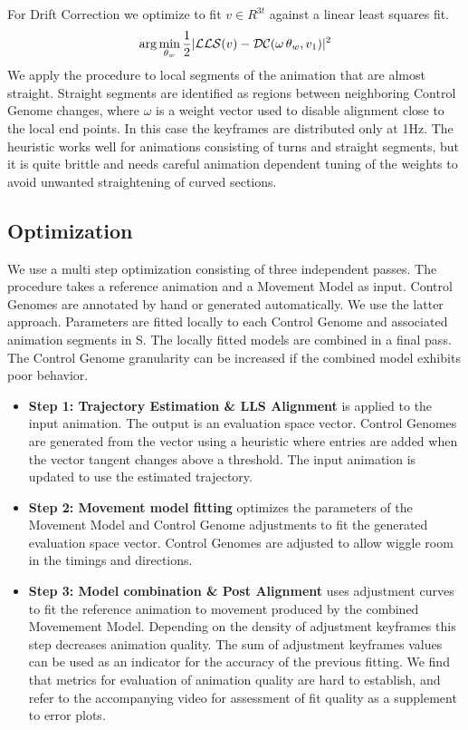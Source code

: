 For Drift Correction we optimize to fit $v \in R^{3t}$ against a linear least squares fit. 
\begin{subequations}
\begin{align}
    \arg\min_{\theta_{w}}{
        \frac{1}{2}|\mathcal{LLS}(v)-\mathcal{DC}(\omega\,\theta_{w},v_1)|^2
    }
\end{align}
\end{subequations}
We apply the procedure to local segments of the animation that are almost straight. Straight segments are identified as regions between neighboring Control Genome changes, where $\omega$ is a weight vector used to disable alignment close to the local end points. In this case the keyframes are distributed only at 1Hz. The heuristic works well for animations consisting of turns and straight segments, but it is quite brittle and needs careful animation dependent tuning of the weights to avoid unwanted straightening of curved sections.
\subsection{Optimization}
We use a multi step optimization consisting of three independent passes. The procedure takes a reference animation and a Movement Model as input. Control Genomes are annotated by hand or generated automatically. We use the latter approach. Parameters are fitted locally to each Control Genome and associated animation segments in S. The locally fitted models are combined in a final pass. The Control Genome granularity can be increased if the combined model exhibits poor behavior.
\begin{itemize}
    \item {\bf{Step 1: Trajectory Estimation \& LLS Alignment}} is applied to the input animation. The output is an evaluation space vector. Control Genomes are generated from the vector using a heuristic where entries are added when the vector tangent changes above a threshold. The input animation is updated to use the estimated trajectory.
    \item {\bf{Step 2: Movement model fitting}} optimizes the parameters of the Movement Model and Control Genome adjustments to fit the generated evaluation space vector. Control Genomes are adjusted to allow wiggle room in the timings and directions.
    \item {\bf{Step 3: Model combination \& Post Alignment}} uses adjustment curves to fit the reference animation to movement produced by the combined Movemement Model. Depending on the density of adjustment keyframes this step decreases animation quality. The sum of adjustment keyframes values can be used as an indicator for the accuracy of the previous fitting. We find that metrics for evaluation of animation quality are hard to establish, and refer to the accompanying video for assessment of fit quality as a supplement to error plots.
\end{itemize}


